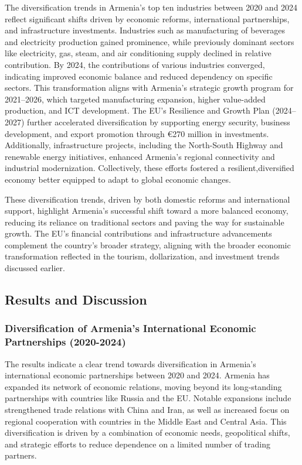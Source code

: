 \documentclass[
]{article}
\begin{document}
The diversification trends in Armenia's top ten industries between 2020
and 2024 reflect significant shifts driven by economic reforms,
international partnerships, and infrastructure investments. Industries
such as manufacturing of beverages and electricity production gained
prominence, while previously dominant sectors like electricity, gas,
steam, and air conditioning supply declined in relative contribution. By
2024, the contributions of various industries converged, indicating
improved economic balance and reduced dependency on specific sectors.
This transformation aligns with Armenia's strategic growth program for
2021--2026, which targeted manufacturing expansion, higher value-added
production, and ICT development. The EU's Resilience and Growth Plan
(2024--2027) further accelerated diversification by supporting energy
security, business development, and export promotion through €270
million in investments. Additionally, infrastructure projects, including
the North-South Highway and renewable energy initiatives, enhanced
Armenia's regional connectivity and industrial modernization.
Collectively, these efforts fostered a resilient,diversified economy
better equipped to adapt to global economic changes\hspace{0pt}.

These diversification trends, driven by both domestic reforms and
international support, highlight Armenia's successful shift toward a
more balanced economy, reducing its reliance on traditional sectors and
paving the way for sustainable growth. The EU's financial contributions
and infrastructure advancements complement the country's broader
strategy, aligning with the broader economic transformation reflected in
the tourism, dollarization, and investment trends discussed earlier.

\newpage

\subsection{Results and Discussion}\label{results-and-discussion}

\subsubsection{Diversification of Armenia's International Economic
Partnerships
(2020-2024)}\label{diversification-of-armenias-international-economic-partnerships-2020-2024}

The results indicate a clear trend towards diversification in Armenia's
international economic partnerships between 2020 and 2024. Armenia has
expanded its network of economic relations, moving beyond its
long-standing partnerships with countries like Russia and the EU.
Notable expansions include strengthened trade relations with China and
Iran, as well as increased focus on regional cooperation with countries
in the Middle East and Central Asia. This diversification is driven by a
combination of economic needs, geopolitical shifts, and strategic
efforts to reduce dependence on a limited number of trading partners.
\end{document}
